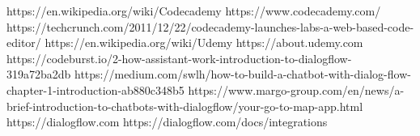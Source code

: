\clearpage
{}
\begin{thebibliography}{99}
	
https://en.wikipedia.org/wiki/Codecademy
https://www.codecademy.com/
https://techcrunch.com/2011/12/22/codecademy-launches-labs-a-web-based-code-editor/
https://en.wikipedia.org/wiki/Udemy
https://about.udemy.com
https://codeburst.io/2-how-assistant-work-introduction-to-dialogflow-319a72ba2db
https://medium.com/swlh/how-to-build-a-chatbot-with-dialog-flow-chapter-1-introduction-ab880c348b5
https://www.margo-group.com/en/news/a-brief-introduction-to-chatbots-with-dialogflow/your-go-to-map-app.html
https://dialogflow.com
https://dialogflow.com/docs/integrations

	
	
	








	
\end{thebibliography}



\clearpage





